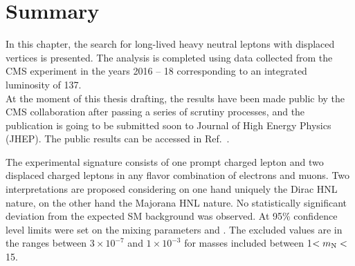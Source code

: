 \clearpage
\section{Summary}
In this chapter, the search for long-lived heavy neutral leptons with displaced
vertices is presented. The analysis is completed using data collected from the
CMS experiment in the years 2016 -- 18 corresponding to an integrated
luminosity of 137\fbinv.\\
At the moment of this thesis drafting, the results have been made
public by the CMS collaboration after passing a series of scrutiny
processes, and the publication is going to be submitted soon to Journal
of High Energy Physics (JHEP). The public results can be accessed in
Ref.~\cite{CMS-PAS-EXO-20-009}.

The experimental signature consists of one prompt charged lepton and two displaced
charged leptons in any flavor combination of electrons
and muons. Two interpretations are proposed considering on one hand uniquely the
Dirac HNL nature, on the other hand the Majorana HNL nature. 
No statistically significant deviation from the expected
SM background was observed. At 95\% confidence level limits were set on the mixing
parameters \mixpare and \mixparm.
The excluded values are in the
ranges between $3\times 10^{-7}$ and $1\times 10^{-3}$ for masses included
between 1\GeV $< m_\mathrm{N} <$ 15\GeV. 

